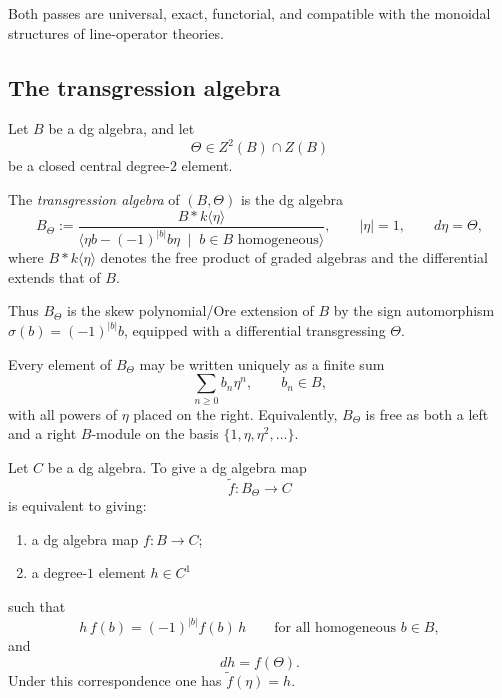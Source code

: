 Both passes are universal, exact, functorial, and compatible with the monoidal structures of line-operator theories.

\subsection{The transgression algebra}
\label{subsec:tholog-transgression-algebra}

Let \(B\) be a dg algebra, and let
\[
\Theta\in Z^{2}(B)\cap Z(B)
\]
be a closed central degree-\(2\) element.

\begin{definition}
\label{def:tholog-transgression-algebra}
The \emph{transgression algebra} of \((B,\Theta)\) is the dg algebra
\[
B_{\Theta}
:=
\frac{B * k\langle \eta\rangle}
{\langle \eta b-(-1)^{|b|}b\eta\;\mid\; b\in B \text{ homogeneous}\rangle},
\qquad |\eta|=1,\qquad d\eta=\Theta,
\]
where \(B * k\langle\eta\rangle\) denotes the free product of graded algebras and the differential extends that of \(B\).
\end{definition}

Thus \(B_{\Theta}\) is the skew polynomial/Ore extension of \(B\) by the sign automorphism \(\sigma(b)=(-1)^{|b|}b\), equipped with a differential transgressing \(\Theta\).

\begin{remark}
\label{rem:tholog-normal-form}
Every element of \(B_{\Theta}\) may be written uniquely as a finite sum
\[
\sum_{n\geq 0} b_{n}\eta^{n},
\qquad b_{n}\in B,
\]
with all powers of \(\eta\) placed on the right.
Equivalently, \(B_{\Theta}\) is free as both a left and a right \(B\)-module on the basis \(\{1,\eta,\eta^{2},\dots\}\).
\end{remark}

\begin{proposition}
\label{prop:tholog-universal-property}
Let \(C\) be a dg algebra.
To give a dg algebra map
\[
\widetilde f:B_{\Theta}\longrightarrow C
\]
is equivalent to giving:
\begin{enumerate}
\item a dg algebra map \(f:B\to C\);
\item a degree-\(1\) element \(h\in C^{1}\)
\end{enumerate}
such that
\[
h\,f(b)=(-1)^{|b|}f(b)\,h
\qquad \text{for all homogeneous } b\in B,
\]
and
\[
dh=f(\Theta).
\]
Under this correspondence one has \(\widetilde f(\eta)=h\).
\end{proposition}

